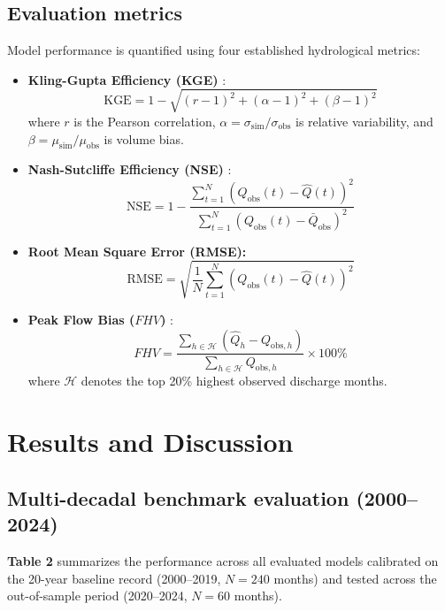 \documentclass[11pt,a4paper,fleqn]{article}
\begin{document}
\subsection{Evaluation metrics}
Model performance is quantified using four established hydrological metrics:
\begin{itemize}
    \item \textbf{Kling-Gupta Efficiency (KGE)} \citep{gupta2009decomposition}:
    \begin{equation}
    \text{KGE} = 1 - \sqrt{(r - 1)^2 + (\alpha - 1)^2 + (\beta - 1)^2}
    \end{equation}
    where $r$ is the Pearson correlation, $\alpha = \sigma_{\text{sim}}/\sigma_{\text{obs}}$ is relative variability, and $\beta = \mu_{\text{sim}}/\mu_{\text{obs}}$ is volume bias.
    \item \textbf{Nash-Sutcliffe Efficiency (NSE)} \citep{nash1970river}:
    \begin{equation}
    \text{NSE} = 1 - \frac{\sum_{t=1}^N (Q_{\text{obs}}(t) - \hat{Q}(t))^2}{\sum_{t=1}^N (Q_{\text{obs}}(t) - \bar{Q}_{\text{obs}})^2}
    \end{equation}
    \item \textbf{Root Mean Square Error (RMSE):}
    \begin{equation}
    \text{RMSE} = \sqrt{\frac{1}{N}\sum_{t=1}^N \left(Q_{\text{obs}}(t) - \hat{Q}(t)\right)^2}
    \end{equation}
    \item \textbf{Peak Flow Bias ($FHV$)} \citep{kratzert2018rainfall}:
    \begin{equation}
    FHV = \frac{\sum_{h \in \mathcal{H}} (\hat{Q}_h - Q_{\text{obs},h})}{\sum_{h \in \mathcal{H}} Q_{\text{obs},h}} \times 100\%
    \end{equation}
    where $\mathcal{H}$ denotes the top 20\% highest observed discharge months.
\end{itemize}

\section{Results and Discussion}

\subsection{Multi-decadal benchmark evaluation (2000--2024)}
\textbf{Table 2} summarizes the performance across all evaluated models calibrated on the 20-year baseline record (2000--2019, $N=240$ months) and tested across the out-of-sample period (2020--2024, $N=60$ months).
\end{document}
